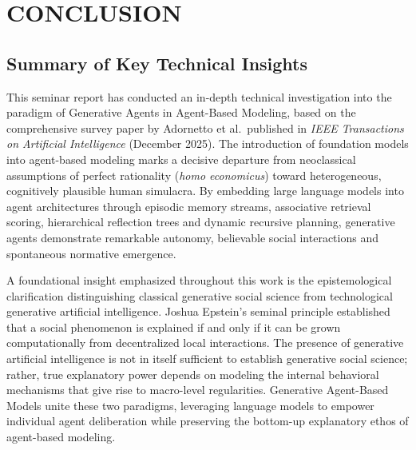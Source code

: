 \documentclass[12pt,a4paper]{report}
\begin{document}

\chapter{CONCLUSION}
\label{chap:conclusion}

\section{Summary of Key Technical Insights}
\label{sec:conclusion_summary}

This seminar report has conducted an in-depth technical investigation into the paradigm of Generative Agents in Agent-Based Modeling, based on the comprehensive survey paper by Adornetto et al.~published in \textit{IEEE Transactions on Artificial Intelligence} (December 2025). The introduction of foundation models into agent-based modeling marks a decisive departure from neoclassical assumptions of perfect rationality (\textit{homo economicus}) toward heterogeneous, cognitively plausible human simulacra. By embedding large language models into agent architectures through episodic memory streams, associative retrieval scoring, hierarchical reflection trees and dynamic recursive planning, generative agents demonstrate remarkable autonomy, believable social interactions and spontaneous normative emergence.

A foundational insight emphasized throughout this work is the epistemological clarification distinguishing classical generative social science from technological generative artificial intelligence. Joshua Epstein's seminal principle established that a social phenomenon is explained if and only if it can be grown computationally from decentralized local interactions. The presence of generative artificial intelligence is not in itself sufficient to establish generative social science; rather, true explanatory power depends on modeling the internal behavioral mechanisms that give rise to macro-level regularities. Generative Agent-Based Models unite these two paradigms, leveraging language models to empower individual agent deliberation while preserving the bottom-up explanatory ethos of agent-based modeling.
\end{document}
